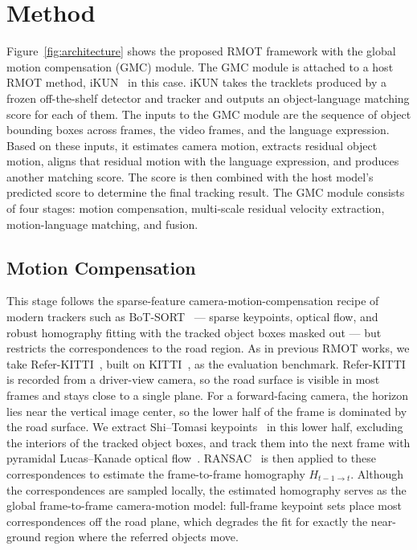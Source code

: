 \documentclass{article}
\begin{document}


\section{Method}
\label{sec:method}
Figure~\ref{fig:architecture} shows the proposed RMOT framework with the global motion compensation (GMC) module. The GMC module is attached to a host RMOT method, iKUN~\cite{ikun} in this case. iKUN takes the tracklets produced by a frozen off-the-shelf detector and tracker and outputs an object-language matching score for each of them. The inputs to the GMC module are the sequence of object bounding boxes across frames, the video frames, and the language expression. Based on these inputs, it estimates camera motion, extracts residual object motion, aligns that residual motion with the language expression, and produces another matching score. The score is then combined with the host model's predicted score to determine the final tracking result. The GMC module consists of four stages: motion compensation, multi-scale residual velocity extraction, motion-language matching, and fusion.


\subsection{Motion Compensation}
\label{sec:ego}
This stage follows the sparse-feature camera-motion-compensation recipe of modern trackers such as BoT-SORT~\cite{botsort} --- sparse keypoints, optical flow, and robust homography fitting with the tracked object boxes masked out --- but restricts the correspondences to the road region. As in previous RMOT works, we take Refer-KITTI~\cite{transrmot}, built on KITTI~\cite{kitti}, as the evaluation benchmark. Refer-KITTI is recorded from a driver-view camera, so the road surface is visible in most frames and stays close to a single plane. For a forward-facing camera, the horizon lies near the vertical image center, so the lower half of the frame is dominated by the road surface. We extract Shi--Tomasi keypoints~\cite{shitomasi} in this lower half, excluding the interiors of the tracked object boxes, and track them into the next frame with pyramidal Lucas--Kanade optical flow~\cite{lucaskanade}. RANSAC~\cite{ransac} is then applied to these correspondences to estimate the frame-to-frame homography $H_{t-1 \to t}$. Although the correspondences are sampled locally, the estimated homography serves as the global frame-to-frame camera-motion model: full-frame keypoint sets place most correspondences off the road plane, which degrades the fit for exactly the near-ground region where the referred objects move.
\end{document}
